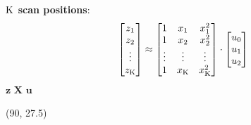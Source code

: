 \begin{frame}[t]
{\begin{textblock}{80}
{{				\textbf{$\operatorname{K}$ scan positions}:
				\begin{equation*}
				\begin{bmatrix} z_{1}\\ z_{2}\\  \vdots \\ z_{\operatorname{K}} \end{bmatrix} \approx 
				\begin{bmatrix} 1 & x_{1} & x_{1}^{2}\\ 1 & x_{2} & x_{2}^{2}\\ \vdots & \vdots & \vdots \\ 1 & x_{\operatorname{K}} & x_{\operatorname{K}}^{2} \end{bmatrix} \cdot
				\begin{bmatrix} u_{0}\\ u_{1}\\ u_{2} \end{bmatrix}
				\end{equation*}
				\hspace*{1.4cm} $\bm{z}$ \hspace*{1.7cm} $\bm{X}$ \hspace*{1.5cm} $\bm{u}$
			}
		}%
	\end{textblock}
	\begin{textblock}{80}(90, 27.5)
		\centering
		\\ 
	\end{textblock}	 
	}
\end{frame}


